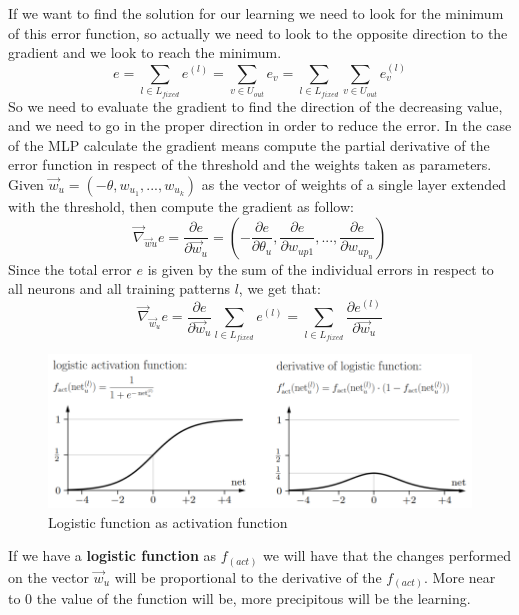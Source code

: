 \documentclass{article}
\begin{document}
If we want to find the solution for our learning we need to look for the minimum of this
error function, so actually we need to look to the opposite direction to the gradient and we
look to reach the minimum.
$$e=\sum_{l\in L_{fixed}}e^{(l)} =\sum_{v\in U_{out}} e_v=\sum_{l\in L_{fixed}}\sum_{v\in U_{out}}e_v^{(l)}$$
So we need to evaluate the gradient to find the direction of the decreasing value, and
we need to go in the proper direction in order to reduce the error. In the case of the MLP
calculate the gradient means compute the partial derivative of the error function in respect
of the threshold and the weights taken as parameters.
\newline\newline
Given $\vec{w}_u=(-\theta,w_{u_1},...,w_{u_k})$ as the vector of weights of a single layer
extended with the threshold, then compute the gradient as follow:
$$\vec{\nabla}_{\vec{w}u}e=\frac{\partial e}{\partial\vec{w}_u}=\left(-\frac{\partial e}{\partial\theta_u},\frac{\partial e}{\partial w_{up1}},...,\frac{\partial e}{\partial w_{up_n}}\right)$$
Since the total error $e$ is given by the sum of the individual errors in respect to all
neurons and all training patterns $l$, we get that:
$$\vec{\nabla}_{\vec{w}_u} e=\frac{\partial e}{\partial\vec{w}_u}\sum_{l\in L_{fixed}}e^{(l)}=\sum_{l\in L_{fixed}}\frac{\partial e^{(l)}}{\partial\vec{w}_u}$$
\begin{figure}[H]
    \centering
    \includegraphics[scale=0.5]{images/logistic_gradient.png}
    \caption{Logistic function as activation function}
    \label{fig:log_func_gradient}
\end{figure}
If we have a \textbf{logistic function} as $f_{(act)}$ we will have that the changes
performed on the vector $\vec{w}_u$ will be proportional to the derivative of the $f_{(act)}$.
More near to $0$ the value of the function will be, more precipitous will be the learning.
\end{document}
